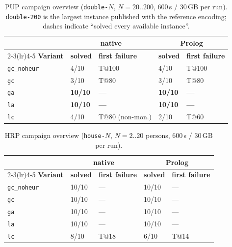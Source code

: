 \begin{table}[H]
\centering
\small
\begin{tabular}{lllll}
\toprule
 & \multicolumn{2}{c}{\textbf{native}} & \multicolumn{2}{c}{\textbf{Prolog}}\\
\cmidrule(lr){2-3}\cmidrule(lr){4-5}
\textbf{Variant} & \textbf{solved} & \textbf{first failure} & \textbf{solved} & \textbf{first failure}\\
\midrule
\texttt{gc\_noheur} & 4/10  & T@100 & 4/10  & T@100\\
\texttt{gc}        & 3/10  & T@80  & 3/10  & T@80\\
\texttt{ga}        & \textbf{10/10} & \textbf{---} & \textbf{10/10} & \textbf{---}\\
\texttt{la}        & \textbf{10/10} & \textbf{---} & \textbf{10/10} & \textbf{---}\\
\texttt{lc}        & 4/10  & T@80 (non-mon.) & 2/10 & T@60\\
\bottomrule
\end{tabular}
\caption{PUP campaign overview (\texttt{double-$N$}, $N=20..200$, 600\,s / 30\,GB per run). \texttt{double-200} is the largest instance published with the reference encoding; dashes indicate \enquote{solved every available instance}.}
\label{tab:overview-pup}
\end{table}

\begin{table}[H]
\centering
\small
\begin{tabular}{lllll}
\toprule
 & \multicolumn{2}{c}{\textbf{native}} & \multicolumn{2}{c}{\textbf{Prolog}}\\
\cmidrule(lr){2-3}\cmidrule(lr){4-5}
\textbf{Variant} & \textbf{solved} & \textbf{first failure} & \textbf{solved} & \textbf{first failure}\\
\midrule
\texttt{gc\_noheur} & 10/10 & --- & 10/10 & ---\\
\texttt{gc}        & 10/10 & --- & 10/10 & ---\\
\texttt{ga}        & 10/10 & --- & 10/10 & ---\\
\texttt{la}        & 10/10 & --- & 10/10 & ---\\
\texttt{lc}        & 8/10  & T@18 & 6/10  & T@14\\
\bottomrule
\end{tabular}
\caption{HRP campaign overview (\texttt{house-$N$}, $N=2..20$ persons, 600\,s / 30\,GB per run).}
\label{tab:overview-hrp}
\end{table}

